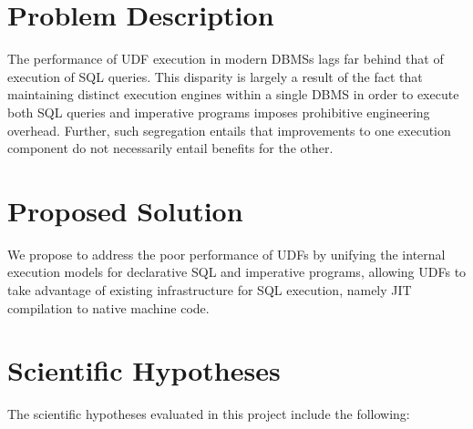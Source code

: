 \documentclass{vldb}
\begin{document}

\section*{Problem Description}

The performance of UDF execution in modern DBMSs lags far behind that of execution of SQL queries. This disparity is largely a result of the fact that maintaining distinct execution engines within a single DBMS in order to execute both SQL queries and imperative programs imposes prohibitive engineering overhead. Further, such segregation entails that improvements to one execution component do not necessarily entail benefits for the other.


\section*{Proposed Solution}

We propose to address the poor performance of UDFs by unifying the internal execution models for declarative SQL and imperative programs, allowing UDFs to take advantage of existing infrastructure for SQL execution, namely JIT compilation to native machine code.


\section*{Scientific Hypotheses}

The scientific hypotheses evaluated in this project include the following:
\end{document}
